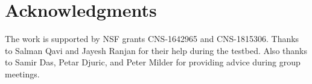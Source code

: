 \section*{Acknowledgments}

The work is supported by NSF grants CNS-1642965 and CNS-1815306. 
Thanks to Salman Qavi and Jayesh Ranjan for their help during the testbed.
Also thanks to Samir Das, Petar Djuric, and Peter Milder for providing advice during group meetings.


